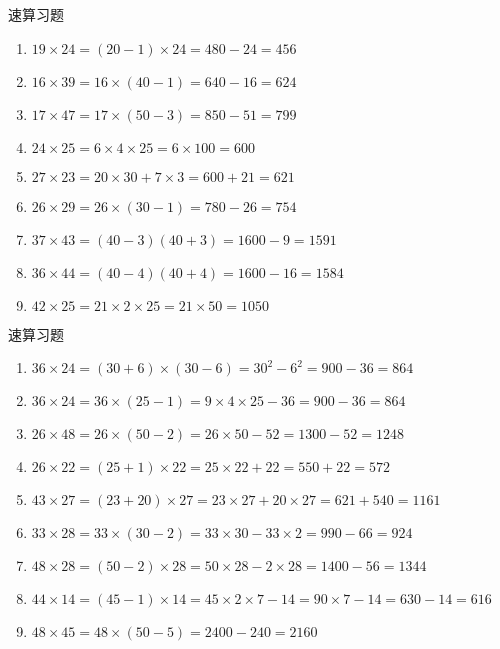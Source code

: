 \documentclass[aspectratio=169]{ctexbeamer} %
\date{\today}
\begin{document}
\begin{frame}[t]{速算习题}
\begin{spacing}{1.2}
\normalsize
\begin{enumerate}[label={\arabic*.}]
\item $ 19 \times 24 =  (20-1) \times 24 = 480 - 24 = 456$
\item $ 16 \times 39 =  16 \times (40-1) = 640 - 16 = 624$
\item $ 17 \times 47 =  17 \times (50-3) = 850 - 51 = 799$
\item $ 24 \times 25 =  6 \times 4 \times 25 = 6 \times 100 = 600$
\item $ 27 \times 23 =  20 \times 30 + 7 \times 3 = 600 + 21 = 621$
\item $ 26 \times 29 =  26 \times (30-1) = 780 - 26 = 754$
\item $ 37 \times 43 =  (40-3)(40+3) = 1600 - 9 = 1591$
\item $ 36 \times 44 =  (40-4)(40+4) = 1600 - 16 = 1584$
\item $ 42 \times 25 =  21 \times 2 \times 25 = 21 \times 50 = 1050$
\end{enumerate}

\end{spacing}
\end{frame}

\begin{frame}[t]{速算习题}
\begin{spacing}{1.2}
\normalsize
\begin{enumerate}[label={\arabic*.}]
\item $ 36 \times 24 =  (30+6) \times (30-6) = 30^2 - 6^2 = 900 - 36 = 864$
\item $ 36 \times 24 =  36 \times (25-1) = 9 \times 4 \times 25 - 36 = 900 - 36 = 864$
\item $ 26 \times 48 =  26 \times (50-2) = 26 \times 50 - 52 = 1300 - 52 = 1248$
\item $ 26 \times 22 =  (25+1) \times 22 = 25 \times 22 + 22 = 550 + 22 = 572$
\item $ 43 \times 27 =  (23+20) \times 27 = 23 \times 27 + 20 \times 27 = 621 + 540 = 1161$
\item $ 33 \times 28 =  33 \times (30-2) = 33 \times 30 - 33 \times 2 = 990 - 66 = 924$
\item $ 48 \times 28 =  (50-2) \times 28 = 50 \times 28 - 2 \times 28 = 1400 - 56 = 1344$
\item $ 44 \times 14 =  (45-1) \times 14 = 45 \times 2 \times 7 - 14 = 90 \times 7 - 14 = 630 - 14 = 616$
\item $ 48 \times 45 =  48 \times (50 - 5) = 2400 - 240 = 2160$
\end{enumerate}

\end{spacing}
\end{frame}
\end{document}
